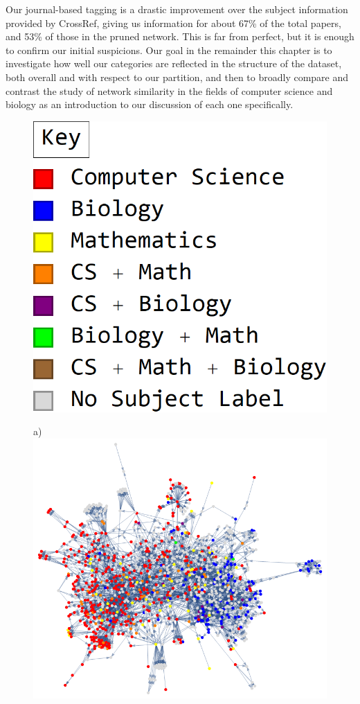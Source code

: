 \documentclass[12pt]{thesis}
\theoremstyle{plain}
\theoremstyle{definition}
\theoremstyle{remark}
\begin{document}
Our journal-based tagging is a drastic improvement over the subject information provided by CrossRef, giving us information for about 67\% of the total papers, and 53\% of those in the pruned network. This is far from perfect, but it is enough to confirm our initial suspicions. Our goal in the remainder this chapter is to investigate how well our categories are reflected in the structure of the dataset, both overall and with respect to our partition, and then to broadly compare and contrast the study of network similarity in the fields of computer science and biology as an introduction to our discussion of each one specifically.

\begin{figure}[p]
\centering
\begin{minipage}[c]{0.23\textwidth}
\includegraphics[width=\textwidth]{color_key.png}
\end{minipage}
\hfill
\begin{minipage}[c]{0.7\textwidth}
a)\includegraphics[width=\textwidth]{color_coded_full.png}

\end{minipage}
\end{figure}
\end{document}
